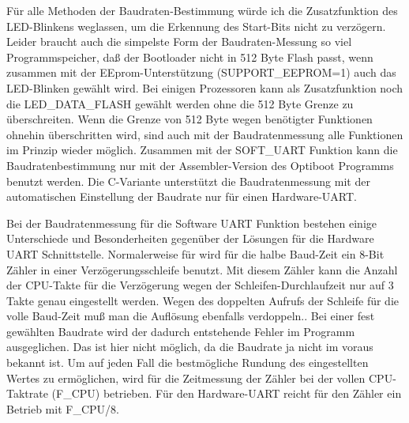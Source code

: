 Für alle Methoden der Baudraten-Bestimmung würde ich die Zusatzfunktion des
LED-Blinkens weglassen, um die Erkennung des Start-Bits nicht zu verzögern.
Leider braucht auch die simpelste Form der Baudraten-Messung so viel
Programmspeicher, daß der Bootloader nicht in 512 Byte Flash passt,
wenn zusammen mit der EEprom-Unterstützung (SUPPORT\_EEPROM=1) auch
das LED-Blinken gewählt wird.
Bei einigen Prozessoren kann als Zusatzfunktion noch die LED\_DATA\_FLASH
gewählt werden ohne die 512 Byte Grenze zu überschreiten. 
Wenn die Grenze von 512 Byte wegen benötigter Funktionen ohnehin überschritten
wird, sind auch mit der Baudratenmessung alle Funktionen im Prinzip
wieder möglich. 
Zusammen mit der SOFT\_UART Funktion kann die Baudratenbestimmung nur mit
der Assembler-Version des Optiboot Programms benutzt werden.
Die C-Variante unterstützt die Baudratenmessung mit der automatischen Einstellung
der Baudrate nur für einen Hardware-UART.

Bei der Baudratenmessung für die Software UART Funktion bestehen einige Unterschiede
und Besonderheiten gegenüber der Lösungen für die Hardware UART Schnittstelle.
Normalerweise  für wird für die halbe Baud-Zeit ein 8-Bit Zähler in einer
Verzögerungsschleife benutzt. Mit diesem Zähler kann die Anzahl der CPU-Takte für die
Verzögerung wegen der Schleifen-Durchlaufzeit nur auf 3 Takte genau eingestellt werden. 
Wegen des doppelten Aufrufs der Schleife für die volle Baud-Zeit muß man 
die Auflösung ebenfalls verdoppeln.. Bei einer fest gewählten
Baudrate wird der dadurch entstehende Fehler im Programm ausgeglichen. 
Das ist hier nicht möglich, da die Baudrate ja nicht im voraus bekannt ist.
Um auf jeden Fall die bestmögliche Rundung des eingestellten Wertes zu ermöglichen,
wird für die Zeitmessung der Zähler bei der vollen CPU-Taktrate (F\_CPU) betrieben.
Für den Hardware-UART reicht für den Zähler ein Betrieb mit F\_CPU/8.

